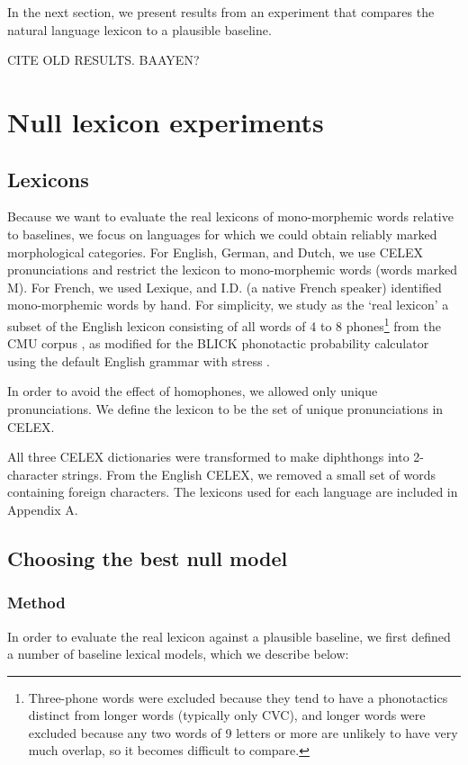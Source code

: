 \documentclass{article}
\begin{document}
In the next section, we present results from an experiment that compares the natural language lexicon to a
plausible baseline.

CITE OLD RESULTS. BAAYEN?

\section{Null lexicon experiments}

\subsection{Lexicons} Because we want to evaluate the real lexicons of mono-morphemic words relative to
baselines, we focus on languages for which we could obtain reliably marked morphological categories. For
English, German, and Dutch, we use CELEX pronunciations and restrict the lexicon to mono-morphemic words
(words marked M). For French, we used Lexique, and I.D. (a native French speaker) identified mono-morphemic
words by hand. For simplicity, we study as the `real lexicon' a subset of the English lexicon consisting of
all words of 4 to 8 phones\footnote{Three-phone words were excluded because they tend to have a phonotactics
distinct from longer words (typically only CVC), and longer words were excluded because any two words of 9
letters or more are unlikely to have very much overlap, so it becomes difficult to compare.} from the CMU
corpus \citep{weide1998cmu}, as modified for the BLICK phonotactic probability calculator using the default
English grammar with stress \citep{hayes_blick_2012}.

In order to avoid the effect of homophones, we allowed only unique pronunciations. We define the lexicon to be
the set of unique pronunciations in CELEX.

All three CELEX dictionaries were transformed to make diphthongs into 2-character strings. From the English
CELEX, we removed a small set of words containing foreign characters. The lexicons used for each language are
included in Appendix A.
 
\subsection{Choosing the best null model}

\subsubsection{Method} In order to evaluate the real lexicon against a plausible baseline, we first defined a
number of baseline lexical models, which we describe below:
\end{document}
